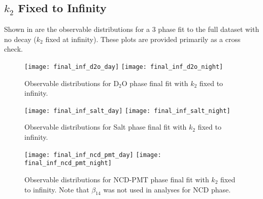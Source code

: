 \clearpage

\subsection{$k_2$ Fixed to Infinity}

Shown in  are the observable distributions for a 3 phase fit to the full dataset with no decay ($k_2$ fixed at infinity). These plots are provided primarily as a cross check.

\begin{figure}
\centering
\texttt{[image: final\_inf\_d2o\_day]}
\texttt{[image: final\_inf\_d2o\_night]}
\caption{\label{fig:final_inf_d2o_obs}Observable distributions for D$_2$O phase final fit with $k_2$ fixed to infinity.}
\end{figure}
\begin{figure}
\centering
\texttt{[image: final\_inf\_salt\_day]}
\texttt{[image: final\_inf\_salt\_night]}
\caption{\label{fig:final_inf_salt_obs}Observable distributions for Salt phase final fit with $k_2$ fixed to infinity.}
\end{figure}
\begin{figure}
\centering
\texttt{[image: final\_inf\_ncd\_pmt\_day]}
\texttt{[image: final\_inf\_ncd\_pmt\_night]}
\caption{\label{fig:final_inf_ncd_pmt_obs}Observable distributions for NCD-PMT phase final fit with $k_2$ fixed to infinity. Note that $\beta_{14}$ was not used in analyses for NCD phase.}
\end{figure}
